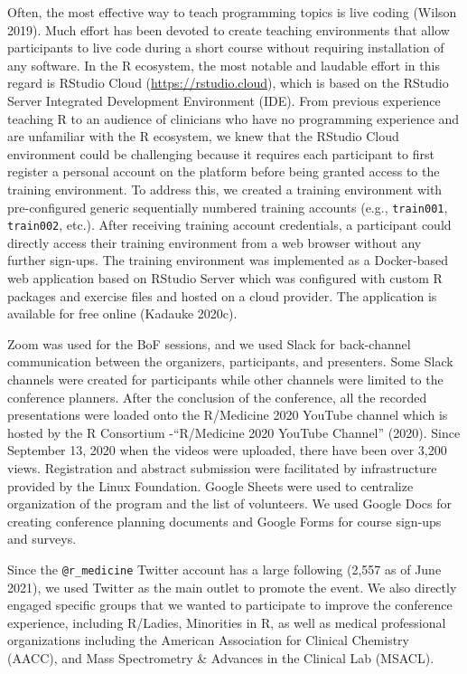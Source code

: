 Often, the most effective way to teach programming topics is live coding (Wilson 2019). Much effort has been devoted to create teaching environments that allow participants to live code during a short course without requiring installation of any software. In the R ecosystem, the most notable and laudable effort in this regard is RStudio Cloud (\url{https://rstudio.cloud}), which is based on the RStudio Server Integrated Development Environment (IDE). From previous experience teaching R to an audience of clinicians who have no programming experience and are unfamiliar with the R ecosystem, we knew that the RStudio Cloud environment could be challenging because it requires each participant to first register a personal account on the platform before being granted access to the training environment. To address this, we created a training environment with pre-configured generic sequentially numbered training accounts (e.g., \texttt{train001}, \texttt{train002}, etc.). After receiving training account credentials, a participant could directly access their training environment from a web browser without any further sign-ups. The training environment was implemented as a Docker-based web application based on RStudio Server which was configured with custom R packages and exercise files and hosted on a cloud provider. The application is available for free online (Kadauke 2020c).

Zoom was used for the BoF sessions, and we used Slack for back-channel communication
between the organizers, participants, and presenters. Some Slack channels were created for participants while other channels were limited to the conference planners. After the conclusion of the conference, all the recorded presentations were loaded onto the
R/Medicine 2020 YouTube channel which is hosted by the R Consortium -{``R/Medicine 2020 YouTube Channel''} (2020). Since
September 13, 2020 when the videos were uploaded, there have been over 3,200
views.
Registration and abstract submission were facilitated by infrastructure
provided by the Linux Foundation. Google Sheets were used to centralize
organization of the program and the list of volunteers. We used Google Docs for creating conference planning documents and Google Forms for course sign-ups and surveys.

Since the \texttt{@r\_medicine} Twitter account has a large following (2,557 as of June 2021), we used Twitter as the main outlet to promote the event. We also directly engaged specific groups that we wanted to participate to improve the conference experience, including R/Ladies, Minorities in R, as well as medical professional organizations including the American Association for Clinical Chemistry (AACC), and Mass Spectrometry \& Advances in the Clinical Lab (MSACL).

